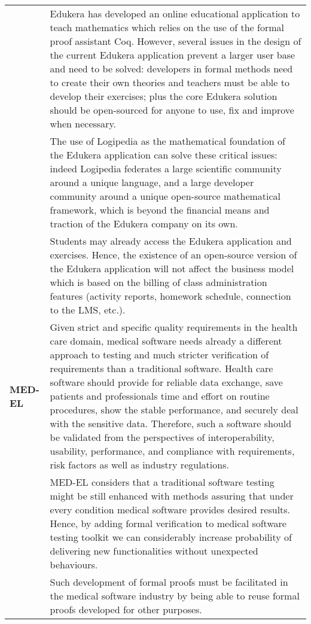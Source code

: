 \begin{longtable*}{|p{0.10\textwidth}|p{0.85\textwidth}|}
&Edukera has developed an online educational application
to teach mathematics which relies on the use of the formal proof
assistant Coq. However, several issues in the design of the current
Edukera application prevent a larger user base and need to be solved:
developers in formal methods need to create their own theories and
teachers must be able to develop their exercises; plus the core
Edukera solution should be open-sourced for anyone to use, fix and
improve when necessary.  \\

&
\hspace{0.4cm} The use of Logipedia as the mathematical foundation of
the Edukera application can solve these critical issues: indeed
Logipedia federates a large scientific community around a unique
language, and a large developer community around a unique open-source
mathematical framework, which is beyond the financial means and
traction of the Edukera company on its own.  \\

&
\hspace{0.4cm} Students may already access the Edukera application and
exercises. Hence, the existence of an open-source version of the
Edukera application will not affect the business model which is based
on the billing of class administration features (activity reports,
homework schedule, connection to the LMS, etc.).  \\

\hline

{\bf MED-EL}
&
Given strict and specific quality requirements in the health care
domain, medical software needs already a different approach to testing
and much stricter verification of requirements than a traditional
software. Health care software should provide for reliable data
exchange, save patients and professionals time and effort on routine
procedures, show the stable performance, and securely deal with the
sensitive data. Therefore, such a software should be validated from
the perspectives of interoperability, usability, performance, and
compliance with requirements, risk factors as well as industry
regulations.\\

&
\hspace{0.4cm}
MED-EL considers that a traditional software testing
might be still enhanced with methods assuring that under every
condition medical software provides desired results. Hence, by adding
formal verification to medical software testing toolkit we can
considerably increase probability of delivering new functionalities
without unexpected behaviours.\\
&
\hspace{0.4cm}
Such development of formal proofs must be facilitated in the 
medical software industry by being able to reuse formal proofs developed
for other purposes.\\


\end{longtable*}
